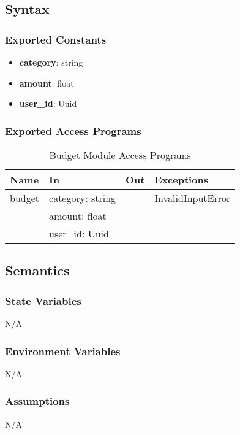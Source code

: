 \documentclass[12pt, titlepage]{article}
\begin{document}
\subsection{Syntax}

\subsubsection{Exported Constants}
\begin{itemize}
  \item \textbf{category}: string
  \item \textbf{amount}: float
  \item \textbf{user\_id}: Uuid
\end{itemize}

\subsubsection{Exported Access Programs}

\begin{center}
  \begin{table}[H]
    \caption{Budget Module Access Programs}
\begin{tabular}{p{4cm} p{4cm} p{4cm} p{4cm}}
\hline
\textbf{Name} & \textbf{In} & \textbf{Out} & \textbf{Exceptions} \\
\hline
budget & category: string &  & InvalidInputError \\
  & amount: float &  &  \\
  & user\_id: Uuid &  &  \\
\hline
\end{tabular}
\end{table}
\end{center}

\subsection{Semantics}

\subsubsection{State Variables}
N/A

\subsubsection{Environment Variables}
N/A

\subsubsection{Assumptions}
N/A
\end{document}
